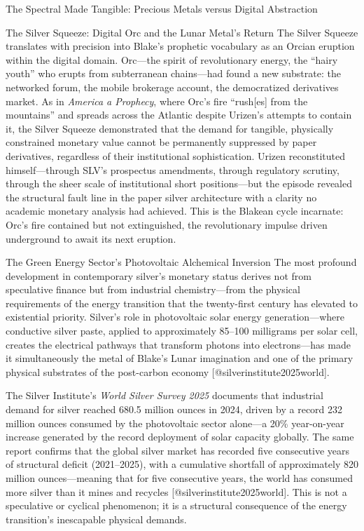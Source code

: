 \documentclass[
  ignorenonframetext,
]{beamer}
\begin{document}
\begin{frame}{The Spectral Made Tangible: Precious Metals versus Digital
Abstraction}
\begin{block}{The Silver Squeeze: Digital Orc and the Lunar Metal's
Return}
The Silver Squeeze translates with precision into Blake's prophetic
vocabulary as an Orcian eruption within the digital domain. Orc---the
spirit of revolutionary energy, the ``hairy youth'' who erupts from
subterranean chains---had found a new substrate: the networked forum,
the mobile brokerage account, the democratized derivatives market. As in
\emph{America a Prophecy}, where Orc's fire ``rush{[}es{]} from the
mountains'' and spreads across the Atlantic despite Urizen's attempts to
contain it, the Silver Squeeze demonstrated that the demand for
tangible, physically constrained monetary value cannot be permanently
suppressed by paper derivatives, regardless of their institutional
sophistication. Urizen reconstituted himself---through SLV's prospectus
amendments, through regulatory scrutiny, through the sheer scale of
institutional short positions---but the episode revealed the structural
fault line in the paper silver architecture with a clarity no academic
monetary analysis had achieved. This is the Blakean cycle incarnate:
Orc's fire contained but not extinguished, the revolutionary impulse
driven underground to await its next eruption.
\end{block}

\begin{block}{The Green Energy Sector's Photovoltaic Alchemical
Inversion}
\protect{}\label{the-green-energy-sectors-photovoltaic-alchemical-inversion}
The most profound development in contemporary silver's monetary status
derives not from speculative finance but from industrial
chemistry---from the physical requirements of the energy transition that
the twenty-first century has elevated to existential priority. Silver's
role in photovoltaic solar energy generation---where conductive silver
paste, applied to approximately 85--100 milligrams per solar cell,
creates the electrical pathways that transform photons into
electrons---has made it simultaneously the metal of Blake's Lunar
imagination and one of the primary physical substrates of the
post-carbon economy {[}@silverinstitute2025world{]}.

The Silver Institute's \emph{World Silver Survey 2025} documents that
industrial demand for silver reached 680.5 million ounces in 2024,
driven by a record 232 million ounces consumed by the photovoltaic
sector alone---a 20\% year-on-year increase generated by the record
deployment of solar capacity globally. The same report confirms that the
global silver market has recorded five consecutive years of structural
deficit (2021--2025), with a cumulative shortfall of approximately 820
million ounces---meaning that for five consecutive years, the world has
consumed more silver than it mines and recycles
{[}@silverinstitute2025world{]}. This is not a speculative or cyclical
phenomenon; it is a structural consequence of the energy transition's
inescapable physical demands.


\end{block}
\end{frame}
\end{document}
